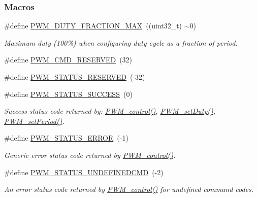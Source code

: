 \subsubsection*{Macros}
\begin{DoxyCompactItemize}
\item 
\#define \hyperlink{_p_w_m_8h_a8b2763bf16c6446a35d536ea532f6a6c}{P\+W\+M\+\_\+\+D\+U\+T\+Y\+\_\+\+F\+R\+A\+C\+T\+I\+O\+N\+\_\+\+M\+A\+X}~((uint32\+\_\+t) $\sim$0)
\begin{DoxyCompactList}\small\item\em Maximum duty (100\%) when configuring duty cycle as a fraction of period. \end{DoxyCompactList}\item 
\#define \hyperlink{_p_w_m_8h_ad731f4db58c72d280900da4be6e3434c}{P\+W\+M\+\_\+\+C\+M\+D\+\_\+\+R\+E\+S\+E\+R\+V\+E\+D}~(32)
\item 
\#define \hyperlink{_p_w_m_8h_a88616e9288d6e3a4dbab321af26cc04a}{P\+W\+M\+\_\+\+S\+T\+A\+T\+U\+S\+\_\+\+R\+E\+S\+E\+R\+V\+E\+D}~(-\/32)
\item 
\#define \hyperlink{_p_w_m_8h_a9b234f3cd0bdffc3da5b56a6c4db9563}{P\+W\+M\+\_\+\+S\+T\+A\+T\+U\+S\+\_\+\+S\+U\+C\+C\+E\+S\+S}~(0)
\begin{DoxyCompactList}\small\item\em Success status code returned by\+: \hyperlink{_p_w_m_8h_ade999f5b12997479efa1ac85aaf46ef5}{P\+W\+M\+\_\+control()}, \hyperlink{_p_w_m_8h_a90979a3b8d525f266c2b82e012f68cee}{P\+W\+M\+\_\+set\+Duty()}, \hyperlink{_p_w_m_8h_ae40714354f46dd6d30dbfb14473c73e0}{P\+W\+M\+\_\+set\+Period()}. \end{DoxyCompactList}\item 
\#define \hyperlink{_p_w_m_8h_a739297dfb10ab4363e7b5db30fdd1ce0}{P\+W\+M\+\_\+\+S\+T\+A\+T\+U\+S\+\_\+\+E\+R\+R\+O\+R}~(-\/1)
\begin{DoxyCompactList}\small\item\em Generic error status code returned by \hyperlink{_p_w_m_8h_ade999f5b12997479efa1ac85aaf46ef5}{P\+W\+M\+\_\+control()}. \end{DoxyCompactList}\item 
\#define \hyperlink{_p_w_m_8h_afed58384f49ce364218eeaabb0858bea}{P\+W\+M\+\_\+\+S\+T\+A\+T\+U\+S\+\_\+\+U\+N\+D\+E\+F\+I\+N\+E\+D\+C\+M\+D}~(-\/2)
\begin{DoxyCompactList}\small\item\em An error status code returned by \hyperlink{_p_w_m_8h_ade999f5b12997479efa1ac85aaf46ef5}{P\+W\+M\+\_\+control()} for undefined command codes. \end{DoxyCompactList}\item 

\end{DoxyCompactItemize}
